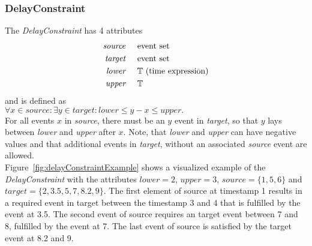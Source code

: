 	\subsubsection{DelayConstraint}
		The \emph{DelayConstraint} has 4 attributes
		\begin{align*}
			\emph{source} & \hspace{.5cm}\text{event set}\\
			\emph{target} & \hspace{.5cm}\text{event set}\\
			\emph{lower}  & \hspace{.5cm}\text{$\mathbb{T}$ (time expression)}\\
			\emph{upper}  & \hspace{.5cm}\text{$\mathbb{T}$}
		\end{align*}
		and is defined as\\[10pt]
		\begin{math}
			\forall x\in source:\exists y\in target: lower\leq y-x\leq upper.
		\end{math}\\[10pt]
		For all events $x$ in \emph{source}, there must be an $y$ event in \emph{target}, so that $y$ lays between \emph{lower} and \emph{upper} after $x$. Note, that \emph{lower} and \emph{upper} can have negative values and that additional events in \emph{target}, without an associated \emph{source} event are allowed.\\
		Figure~\ref{fig:delayConstraintExample} shows a visualized example of the \emph{DelayConstraint} with the attributes $lower=2$, $upper=3$, $source=\{1, 5, 6\}$ and $target=\{2, 3.5, 5, 7, 8.2, 9\}$. The first element of source at timestamp 1 results in a required event in target between the timestamp 3 and 4 that is fulfilled by the event at 3.5. The second event of source requires an target event between 7 and 8, fulfilled by the event at 7. The last event of source is satisfied by the target event at 8.2 and 9.
